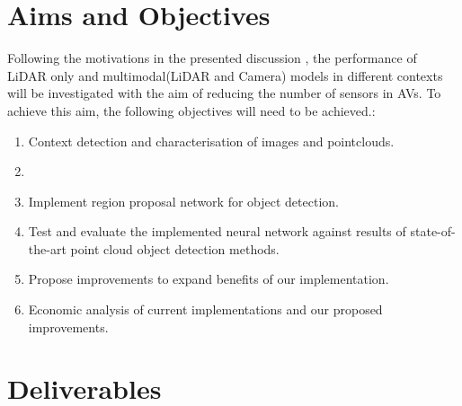 \section{Aims and Objectives}
Following the motivations in the presented discussion , the performance of LiDAR only and multimodal(LiDAR and Camera) models in different contexts will be investigated with the aim of reducing the number of sensors in AVs. 
To achieve this aim, the following objectives will need to be achieved.:
\begin{enumerate}
	\item Context detection and characterisation of images and pointclouds. 
	\item 
	\item Implement region proposal network for object detection.
	\item Test and evaluate the implemented neural network against results of state-of-the-art point cloud object detection methods.
	\item Propose improvements to expand benefits of our implementation.
	\item Economic analysis of current implementations and our proposed improvements. 
\end{enumerate}

\section{Deliverables}

